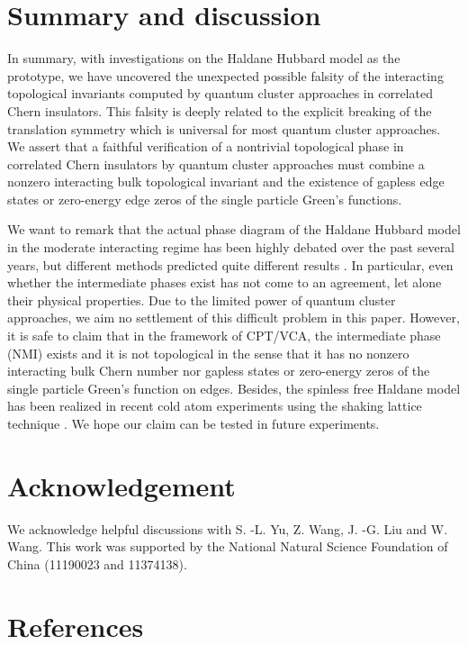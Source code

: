 \documentclass[12pt]{iopart}
\begin{document}
\section{Summary and discussion}\label{SD}

\par In summary, with investigations on the Haldane Hubbard model as the prototype, we have uncovered the unexpected possible falsity of the interacting topological invariants computed by quantum cluster approaches in correlated Chern insulators. This falsity is deeply related to the explicit breaking of the translation symmetry which is universal for most quantum cluster approaches. We assert that a faithful verification of a nontrivial topological phase in correlated Chern insulators by quantum cluster approaches must combine a nonzero interacting bulk topological invariant and the existence of gapless edge states or zero-energy edge zeros of the single particle Green's functions.

\par We want to remark that the actual phase diagram of the Haldane Hubbard model in the moderate interacting regime has been highly debated over the past several years, but different methods predicted quite different results \cite{HZKL_PRB2011-1,HZKL_PRB2011-2,MR_PRB2013,HRP_PRB2015,ZSWZ_PRB2015,HCPP_PRL2016,VSLTHT_PRL2016,IWT_PRB2016,ASHP_PRB2016,GJMP_PRB2016,GR_NJP2018,LTTNNH_PBCM2018}. In particular, even whether the intermediate phases exist has not come to an agreement, let alone their physical properties. Due to the limited power of quantum cluster approaches, we aim no settlement of this difficult problem in this paper. However, it is safe to claim that in the framework of CPT/VCA, the intermediate phase (NMI) exists and it is not topological in the sense that it has no nonzero interacting bulk Chern number nor gapless states or zero-energy zeros of the single particle Green's function on edges. Besides, the spinless free Haldane model has been realized in recent cold atom experiments using the shaking lattice technique \cite{JMDRLUGE_N2014}. We hope our claim can be tested in future experiments.


\section*{Acknowledgement}
\par We acknowledge helpful discussions with S. -L. Yu, Z. Wang, J. -G. Liu and W. Wang. This work was supported by the National Natural Science Foundation of China (11190023 and 11374138).

\section*{References}

\end{document}
